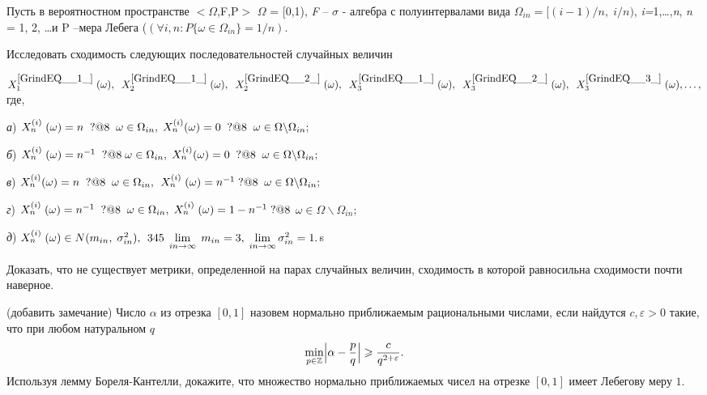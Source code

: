 \begin{problem}
Пусть в вероятностном пространстве  $<$$\Omega$,F,P$>$  $\Omega$ = [0,1), \textit{F}  -- $\sigma$ - алгебра с полуинтервалами вида $\Omega _{in} =[(i-1)/n,\; i/n)$,  \textit{i=}1,\dots ,\textit{n}, \textit{n }= 1, 2, \dots  и P --мера  Лебега ($(\forall i,n:P\{ \omega \in \Omega _{in} \} =1/n)$.

Исследовать сходимость следующих последовательностей случайных величин 

$X_{1}^{\eqref{GrindEQ__1_}} \; (\omega ),\; \; X_{2}^{\eqref{GrindEQ__1_}} \; (\omega ),\; \; X_{2}^{\eqref{GrindEQ__2_}} \; (\omega ),\; \; X_{3}^{\eqref{GrindEQ__1_}} \; (\omega ),\; \; X_{3}^{\eqref{GrindEQ__2_}} \; (\omega ),\; \; X_{3}^{\eqref{GrindEQ__3_}} \; (\omega ),\ldots ,$где, 

\textit{а}) $X_{n}^{(i)} \; (\omega )=n\; \; {\rm ?@8}\; \; \omega \in \Omega _{in} ,\; X_{n}^{(i)} (\omega )=0\; \; {\rm ?@8}\; \; \omega \in \Omega \backslash \Omega _{in} ;$

\textit{б}) $X_{n}^{(i)} \; (\omega )=n^{-1} \; \; {\rm ?@8}\; \omega \in \Omega _{in} ,\; X_{n}^{(i)} (\omega )=0\; \; {\rm ?@8}\; \; \omega \in \Omega \backslash \Omega _{in} ;$

\textit{в}) $X_{n}^{(i)} (\omega )=n\; \; {\rm ?@8}\; \; \omega \in \Omega _{in} ,\; \, X_{n}^{(i)} \; (\omega )=n^{-1} \; {\rm ?@8}\; \; \omega \in \Omega \backslash \Omega _{in} ;$

\textit{г}) $X_{n}^{(i)} \; (\omega )=n^{-1} \; \; {\rm ?@8}\; \; \omega \in \Omega _{in} ,\; X_{n}^{(i)} \; (\omega )=1-n^{-1} \; {\rm ?@8}$ $\omega \in \Omega \backslash \Omega _{in} ;$

\textit{д}) $X_{n}^{(i)} \; (\omega )\in N(m_{in} ,\; \sigma _{in}^{2} ),\; \, {\rm 345}\; \mathop{\lim }\limits_{in\to \infty } \; m_{in} =3,\; \mathop{\lim }\limits_{in\to \infty } \sigma _{in}^{2} =1.$s
\end{problem}

\begin{problem}
Доказать, что не существует метрики, определенной на парах случайных величин, сходимость в которой равносильна сходимости почти наверное.
\end{problem}

\begin{problem} (добавить замечание)
Число $\alpha$ из отрезка $[0, 1]$ назовем нормально приближаемым рациональными числами, если найдутся $c,\varepsilon>0$ такие, что 
при любом натуральном $q$ 
\begin{equation}
\label{BorelKantel}
\min\limits_{p\in {\mathbb Z}} \Bigl|\alpha-\frac{p}{q} \Bigr|\geqslant \frac{c}{q^{2+\varepsilon}} . 
\end{equation}
Используя лемму Бореля-Кантелли, докажите, что множество нормально приближаемых чисел на отрезке $[0, 1]$ имеет Лебегову меру $1$. 

\end{problem}

